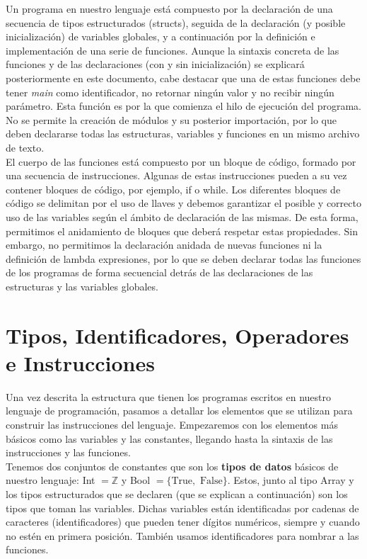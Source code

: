 \documentclass[12pt,onecolumn]{article}
\begin{document}
	Un programa en nuestro lenguaje está compuesto por la declaración de una secuencia de tipos estructurados (structs), seguida de la declaración (y posible inicialización) de variables globales, y a continuación por la definición e implementación de una serie de funciones. Aunque la sintaxis concreta de las funciones y de las declaraciones (con y sin inicialización) se explicará posteriormente en este documento, cabe destacar que una de estas funciones debe tener \textit{main} como identificador, no retornar ningún valor y no recibir ningún parámetro. Esta función es por la que comienza el hilo de ejecución del programa. No se permite la creación de módulos y su posterior importación, por lo que deben declararse todas las estructuras, variables y funciones en un mismo archivo de texto. \\
	
	El cuerpo de las funciones está compuesto por un bloque de código, formado por una secuencia de instrucciones. Algunas de estas instrucciones pueden a su vez contener bloques de código, por ejemplo, if o while. Los diferentes bloques de código se delimitan por el uso de llaves y debemos garantizar el posible y correcto uso de las variables según el ámbito de declaración de las mismas. De esta forma, permitimos el anidamiento de bloques que deberá respetar estas propiedades. Sin embargo, no permitimos la declaración anidada de nuevas funciones ni la definición de lambda expresiones, por lo que se deben declarar todas las funciones de los programas de forma secuencial detrás de las declaraciones de las estructuras y las variables globales. \\
	
	\section{Tipos, Identificadores, Operadores e Instrucciones}
	
	Una vez descrita la estructura que tienen los programas escritos en nuestro lenguaje de programación, pasamos a detallar los elementos que se utilizan para construir las instrucciones del lenguaje. Empezaremos con los elementos más básicos como las variables y las constantes, llegando hasta la sintaxis de las instrucciones y las funciones. \\
	
	Tenemos dos conjuntos de constantes que son los \textbf{tipos de datos} básicos de nuestro lenguaje: Int $=\mathbb{Z}$ y Bool $= \{\text{True}, \text{ False}\}$. Estos, junto al tipo Array y los tipos estructurados que se declaren (que se explican a continuación) son los tipos que toman las variables. Dichas variables están identificadas por cadenas de caracteres (identificadores) que pueden tener dígitos numéricos, siempre y cuando no estén en primera posición. También usamos identificadores para nombrar a las funciones. \\
	
\end{document}
